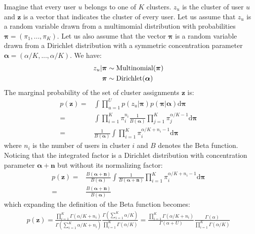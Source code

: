 \documentclass[smallextended]{svjour3}          %
\begin{document}
Imagine that every user $u$ belongs to one of $K$ clusters. $z_u$ is the cluster of user $u$ and $\mathbf{z}$ is a vector that indicates the cluster of every user. Let us assume that $z_u$ is a random variable drawn from a multimomial distribution with probabilities $\boldsymbol{\pi}= (\pi_1,...,\pi_K)$. Let us also assume that the vector $\boldsymbol{\pi}$ is a random variable drawn from a Dirichlet distribution with a symmetric concentration parameter $\boldsymbol{\alpha} = (\alpha/K,...,\alpha/K)$. We have: 
\begin{align*}
z_u | \boldsymbol{\pi} &\sim \text{Multinomial}(\boldsymbol{\pi})\notag\\
\boldsymbol{\pi} &\sim \text{Dirichlet}(\boldsymbol{\alpha})
\end{align*}
The marginal probability of the set of cluster assignments $\mathbf{z}$ is:
\begin{align*}
p(\mathbf{z}) =& 
\int \prod_{u=1}^U p(z_u | \boldsymbol{\pi})p(\boldsymbol{\pi} | \boldsymbol{\alpha})
\text{d}\boldsymbol{\pi}\\
=&\int 
   \prod_{i=1}^K \pi_i^{n_i} 
   \frac{1}{B(\boldsymbol{\alpha})}
   \prod_{j=1}^K \pi_j^{\alpha/K-1}
   \text{d}\boldsymbol{\pi}\\
=&
\frac{1}{B(\boldsymbol{\alpha})}
\int 
   \prod_{i=1}^K \pi_i^{\alpha/K + n_i - 1}
   \text{d}\boldsymbol{\pi}
\end{align*}
where $n_i$ is the number of users in cluster $i$ and $B$ denotes the Beta function. Noticing that the integrated factor is a Dirichlet distribution with concentration parameter $\boldsymbol{\alpha} + \mathbf{n}$ but without its normalizing factor:
\begin{align*}
p(\mathbf{z})=&
\frac{
B(\boldsymbol{\alpha} + \mathbf{n})
}{
B(\boldsymbol{\alpha})
}%
\int 
   \frac{1}{
   B(\boldsymbol{\alpha + \mathbf{n}})
   }
   \prod_{i=1}^K \pi_i^{\alpha/K + n_i - 1}
   \text{d}\boldsymbol{\pi}\\
=& 
\frac{
B(\boldsymbol{\alpha} + \mathbf{n})
}{
B(\boldsymbol{\alpha})
}
\end{align*}
which expanding the definition of the Beta function becomes:
\begin{align}
p(\mathbf{z})=
\frac{
\prod_{i=1}^K \Gamma(\alpha/K + n_i)
}
{
\Gamma \left(\sum_{i=1}^K \alpha/K + n_i \right)
}
\frac{
\Gamma \left(\sum_{i=1}^K \alpha/K \right)
}
{
\prod_{i=1}^K \Gamma(\alpha/K)
}
= 
\frac{
	\prod_{i=1}^K \Gamma(\alpha/K + n_i)
}
{
	\Gamma \left(\alpha + U \right)
}
\frac{
	\Gamma \left(\alpha \right)
}
{
	\prod_{i=1}^K \Gamma(\alpha/K)
}
\label{eq:p_z}
\end{align}
\end{document}
